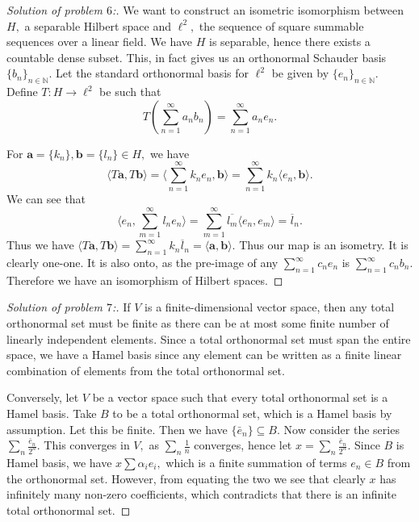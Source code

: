\documentclass[letterpaper,11pt,twoside]{article}
\theoremstyle{proposition}
\theoremstyle{definition}
\theoremstyle{theorem}
\theoremstyle{definition}
\theoremstyle{definition}
\theoremstyle{definition}
\theoremstyle{lemma}
\theoremstyle{definition}
\theoremstyle{definition}
\theoremstyle{corollary}
\theoremstyle{definition}
\theoremstyle{definition}
\theoremstyle{definition}
\begin{document}
\begin{proof}[Solution of problem $6$:]
	We want to construct an isometric isomorphism between $H,$ a separable Hilbert space and $\ell^2,$ the sequence of square summable sequences over a 
	linear 
	field. We have $H$ is separable, hence there exists a countable dense subset. This, in fact gives us an orthonormal Schauder basis $\{b_n\}_{n \in 
		\mathbb{N}}$. Let the standard orthonormal basis for $\ell^2$ be given by $\{e_n\}_{n \in \mathbb{N}}.$ Define $T:H \to \ell^2$ be such that 
	$$T(\sum_{n=1}^{\infty}a_n b_n) = \sum_{n=1}^{\infty}a_n e_n.$$
	
	For $\mathbf{a}= \{k_n\}, \mathbf{b}= \{l_n\} \in H,$ we have 
	$$	\langle T\mathbf{a}, T \mathbf{b} \rangle =  \langle \sum_{n=1}^{\infty} k_ne_n, \mathbf{b} \rangle = \sum_{n=1}^{\infty} k_n \langle e_n, 
	\mathbf{b} 
	\rangle.$$ We can see that $$\langle e_n, \sum_{m=1}^{\infty} l_n e_n \rangle = \sum_{m=1}^{\infty} \overline{l_m} \langle e_n,e_m \rangle = 
	\overline{l}_n.$$  Thus we have $\langle T\mathbf{a}, T \mathbf{b} \rangle = \sum_{n=1}^{\infty} k_n \overline{l}_n= \langle \mathbf{a}, \mathbf{b} 
	\rangle.$ Thus our map is an isometry. It is clearly one-one. It is also onto, as the pre-image of any $\sum_{n=1}^{\infty} c_n e_n$ is 
	$\sum_{n=1}^{\infty} 
	c_n b_n.$ Therefore we have an isomorphism of Hilbert spaces. 
	\end{proof}
\begin{proof}[Solution of problem $7$:]
If $V$ is a finite-dimensional vector space, then any total orthonormal set must be finite as there can be at most some finite number of linearly 
independent elements. Since a total orthonormal set must span the entire space, we have a Hamel basis since any element can be written as a finite 
linear 
combination of elements from the total orthonormal set.

Conversely, let $V$ be a vector space such that every total orthonormal set is a Hamel basis. Take $B$ to be a total orthonormal set, which is a Hamel basis 
by assumption. Let this be finite. Then we have $\{\bar{e}_n\} \subseteq B.$ Now consider the series $\sum_{n}\frac{\bar{e}_n}{2^n}.$ This converges in $V,$ 
as $\sum_{n}\frac{1}{n}$ converges, hence let $x= \sum_{n} \frac{\bar{e}_n}{2^n}.$ Since $B$ is Hamel basis, we have $x \sum \alpha_ie_i,$ which is a finite 
summation of terms $e_n \in B$ from the orthonormal set. However, from equating the two we see that clearly $x$ has infinitely many non-zero coefficients, 
which contradicts that there is an infinite total orthonormal set. 
\end{proof}
\end{document}
